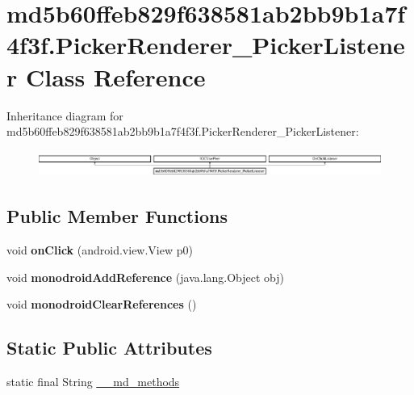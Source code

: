\hypertarget{classmd5b60ffeb829f638581ab2bb9b1a7f4f3f_1_1PickerRenderer__PickerListener}{}\section{md5b60ffeb829f638581ab2bb9b1a7f4f3f.\+Picker\+Renderer\+\_\+\+Picker\+Listener Class Reference}
\label{classmd5b60ffeb829f638581ab2bb9b1a7f4f3f_1_1PickerRenderer__PickerListener}
Inheritance diagram for md5b60ffeb829f638581ab2bb9b1a7f4f3f.\+Picker\+Renderer\+\_\+\+Picker\+Listener\+:\begin{figure}[H]
\begin{center}
\leavevmode
\includegraphics[height=0.868217cm]{classmd5b60ffeb829f638581ab2bb9b1a7f4f3f_1_1PickerRenderer__PickerListener}
\end{center}
\end{figure}
\subsection*{Public Member Functions}
\begin{DoxyCompactItemize}
\item 
\mbox{\label{classmd5b60ffeb829f638581ab2bb9b1a7f4f3f_1_1PickerRenderer__PickerListener_aef0d59497745728afe6baf752662eb80}} 
void {\bfseries on\+Click} (android.\+view.\+View p0)
\item 
\mbox{\label{classmd5b60ffeb829f638581ab2bb9b1a7f4f3f_1_1PickerRenderer__PickerListener_a1ecadd473c72ac34242c9c05a4fbee20}} 
void {\bfseries monodroid\+Add\+Reference} (java.\+lang.\+Object obj)
\item 
\mbox{\label{classmd5b60ffeb829f638581ab2bb9b1a7f4f3f_1_1PickerRenderer__PickerListener_ac661d5ab4c8deffbe678f76e609c7e1f}} 
void {\bfseries monodroid\+Clear\+References} ()
\end{DoxyCompactItemize}
\subsection*{Static Public Attributes}
\begin{DoxyCompactItemize}
\item 
static final String \hyperlink{classmd5b60ffeb829f638581ab2bb9b1a7f4f3f_1_1PickerRenderer__PickerListener_a69ae8fbc93864ac38ac6d4c96542e2b5}{\+\_\+\+\_\+md\+\_\+methods}
\end{DoxyCompactItemize}
